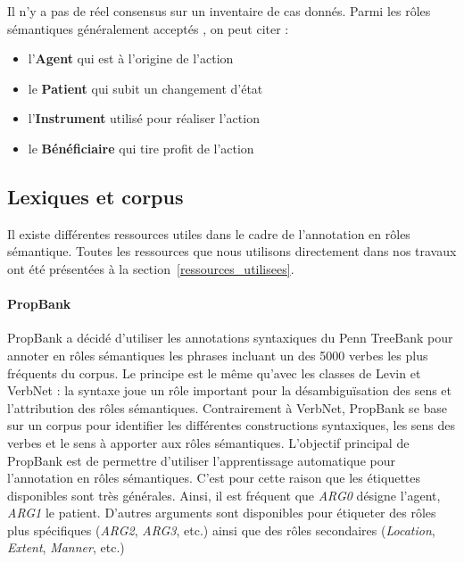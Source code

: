 Il n'y a pas de réel consensus sur un inventaire de cas donnés. Parmi les rôles
sémantiques généralement acceptés \citep[p.~4]{palmer2010semantic}, on peut
citer :

\begin{itemize}
    \item l'\textbf{Agent} qui est à l'origine de l'action
    \item le \textbf{Patient} qui subit un changement d'état
    \item l'\textbf{Instrument} utilisé pour réaliser l'action
    \item le \textbf{Bénéficiaire} qui tire profit de l'action
\end{itemize}

\subsection{Lexiques et corpus}
\label{ressources_non_utilisees}

Il existe différentes ressources utiles dans le cadre de l'annotation en rôles
sémantique. Toutes les ressources que nous utilisons directement dans nos
travaux ont été présentées à la section~\ref{ressources_utilisees}.

\paragraph{PropBank}

PropBank \citep{palmer2005proposition} a décidé d'utiliser les annotations
syntaxiques du Penn TreeBank \citep{marcus1993building} pour annoter en rôles
sémantiques les phrases incluant un des 5000 verbes les plus fréquents du
corpus. Le principe est le même qu'avec les classes de Levin et VerbNet : la
syntaxe joue un rôle important pour la désambiguïsation des sens et
l'attribution des rôles sémantiques. Contrairement à VerbNet, PropBank se base
sur un corpus pour identifier les différentes constructions syntaxiques, les
sens des verbes et le sens à apporter aux rôles sémantiques. L'objectif
principal de PropBank est de permettre d'utiliser l'apprentissage automatique
pour l'annotation en rôles sémantiques. C'est pour cette raison que les
étiquettes disponibles sont très générales. Ainsi, il est fréquent que
\textit{ARG0} désigne l'agent, \textit{ARG1} le patient. D'autres arguments
sont disponibles pour étiqueter des rôles plus spécifiques (\textit{ARG2},
\textit{ARG3}, etc.) ainsi que des rôles secondaires (\textit{Location},
\textit{Extent}, \textit{Manner}, etc.)

